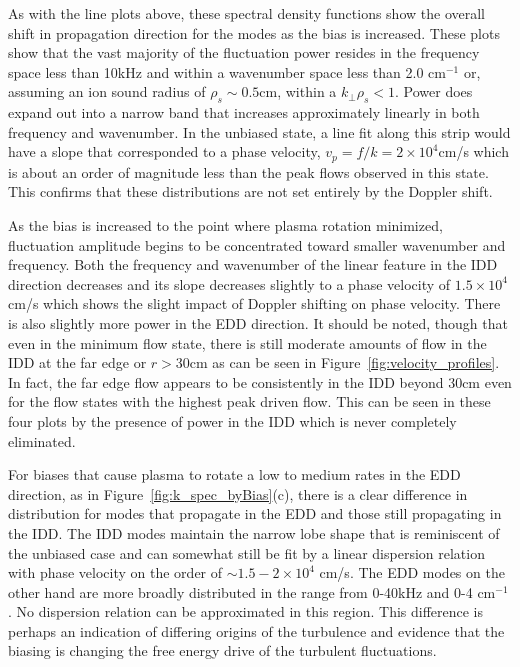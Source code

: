 \documentclass[aip,pop,amsmath,amssymb,reprint,superscriptaddress]{revtex4-1} %
\begin{document}
As with the line plots above, these spectral density functions show the overall shift in propagation direction for the modes as the bias is increased. These plots show that the vast majority of the fluctuation power resides in the frequency space less than 10kHz and within a wavenumber space less than 2.0 $\text{cm}^{-1}$ or, assuming an ion sound radius of $\rho_{s} \sim 0.5$cm, within a $k_{\perp}\rho_{s} < 1$. Power does expand out into a narrow band that increases approximately linearly in both frequency and wavenumber. In the unbiased state, a line fit along this strip would have a slope that corresponded to a phase velocity, $v_{p} = f/k = 2 \times 10^{4} $cm/s which is about an order of magnitude less than the peak flows observed in this state. This confirms that these distributions are not set entirely by the Doppler shift.

As the bias is increased to the point where plasma rotation minimized, fluctuation amplitude begins to be concentrated toward smaller wavenumber and frequency. Both the frequency and wavenumber of the linear feature in the IDD direction decreases and its slope decreases slightly to a phase velocity of $1.5 \times 10^{4}$ cm/s which shows the slight impact of Doppler shifting on phase velocity. There is also slightly more power in the EDD direction. It should be noted, though that even in the minimum flow state, there is still moderate amounts of flow in the IDD at the far edge or $r>30$cm as can be seen in Figure~\ref{fig:velocity_profiles}. In fact, the far edge flow appears to be consistently in the IDD beyond 30cm even for the flow states with the highest peak driven flow. This can be seen in these four plots by the presence of power in the IDD which is never completely eliminated. 

For biases that cause plasma to rotate a low to medium rates in the EDD direction, as in Figure~\ref{fig:k_spec_byBias}(c), there is a clear difference in distribution for modes that propagate in the EDD and those still propagating in the IDD. The IDD modes maintain the narrow lobe shape that is reminiscent of the unbiased case and can somewhat still be fit by a linear dispersion relation with phase velocity on the order of $\sim 1.5-2 \times 10^{4}$ cm/s. The EDD modes on the other hand are more broadly distributed in the range from 0-40kHz and 0-4 $\text{cm}^{-1}$. No dispersion relation can be approximated in this region. This difference is perhaps an indication of differing origins of the turbulence and evidence that the biasing is changing the free energy drive of the turbulent fluctuations. 
\end{document}
